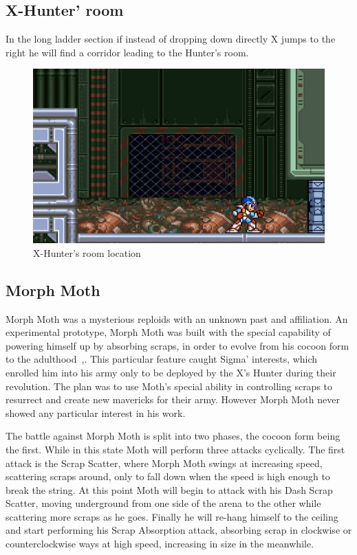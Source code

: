 \subsection{X-Hunter' room}
In the long ladder section if instead of dropping down directly X jumps to the right he will find a corridor leading to the Hunter's room.

\begin{figure}[htp]
	\centering
	\includegraphics[width=0.8\linewidth]{figures/X2/Morph_moth/Moth_Hunter_room.jpg}
	\caption{X-Hunter's room location}
\end{figure}

\subsection{Morph Moth}\label{boss:Morph_moth}
Morph Moth was a mysterious reploids with an unknown past and affiliation. An experimental prototype, Morph Moth was built with the special capability  of powering himself up by absorbing scraps, in order to evolve from his cocoon form to the adulthood~\cite{wiki:Morph_moth},\cite{wayback:X2_resources}. This particular feature caught Sigma' interests, which enrolled him into his army only to be deployed by the X's Hunter during their revolution. The plan was to use Moth's special ability in controlling scraps to resurrect and create new mavericks for their army. However Morph Moth never showed any particular interest in his work.

The battle against Morph Moth is split into two phases, the cocoon form being the first. While in this state Moth will perform three attacks cyclically. The first attack is the Scrap Scatter, where Morph Moth swings at increasing speed, scattering scraps around, only to fall down when the speed is high enough to break the string. At this point Moth will begin to attack with his Dash Scrap Scatter, moving underground from one side of the arena to the other while scattering more scraps as he goes. Finally he will re-hang himself to the ceiling and start performing his Scrap Absorption attack, absorbing scrap in clockwise or counterclockwise ways at high speed, increasing in size in the meanwhile. 

